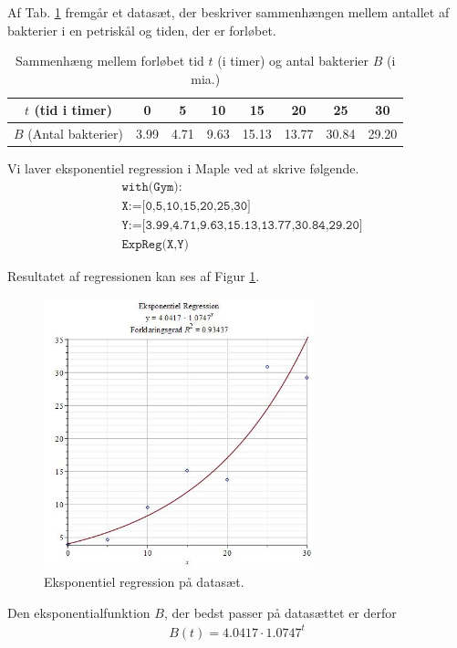 \begin{exa}
Af Tab. \ref{tab:1} fremgår et datasæt, der beskriver sammenhængen mellem antallet af bakterier i en petriskål og tiden, der er forløbet.
\begin{table}[H]
	\centering
	\begin{tabular}{c|c|c|c|c|c|c|c}
		$t$ (tid i timer) & 0 & 5 & 10 & 15 & 20 & 25 & 30\\
		\hline
		$B$ (Antal bakterier) & 3.99 & 4.71 & 9.63 & 15.13 & 13.77 & 30.84 & 29.20
	\end{tabular}
	\caption{Sammenhæng mellem forløbet tid $t$ (i timer) og antal bakterier $B$ (i mia.)}
	\label{tab:1}
\end{table}

Vi laver eksponentiel regression i Maple ved at skrive følgende.
\begin{align*}
	&\texttt{with(Gym):}\\
	&\texttt{X:=[0,5,10,15,20,25,30]}\\
	&\texttt{Y:=[3.99,4.71,9.63,15.13,13.77,30.84,29.20]}\\
	&\texttt{ExpReg(X,Y)}
\end{align*}

Resultatet af regressionen kan ses af Figur \ref{fig:regres}.
\begin{figure}[H]
	\centering
	\includegraphics[width=0.7\textwidth]{Billeder/EkspReg.jpg}
	\caption{Eksponentiel regression på datasæt.}
	\label{fig:regres}
\end{figure}
Den eksponentialfunktion $B$, der bedst passer på datasættet er derfor
\begin{align*}
	B(t) = 4.0417\cdot 1.0747^t
\end{align*}

\end{exa}

